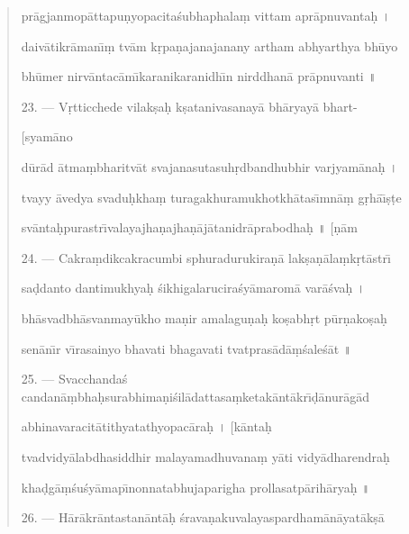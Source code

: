 \documentclass[a4paper, 11pt, oneside, french]{article}
\begin{document}
\begin{quotation}
pr\={a}gjanmop\={a}ttapu\d{n}yopacita\'{s}ubhaphala\d{m} vittam apr\={a}pnuvanta\d{h} \texthindi{।}

daiv\={a}tikr\={a}man\={\i}\d{m} tv\={a}m k\d{r}pa\d{n}ajanajanany artham abhyarthya bh\={u}yo

bh\={u}mer nirv\={a}ntac\={a}m\={\i}karanikaranidh\={\i}n nirddhan\={a} pr\={a}pnuvanti \texthindi{॥}

\bigskip

23. --- V\d{r}tticchede vilak\d{s}a\d{h} k\d{s}atanivasanay\={a} bh\={a}ryay\={a} bhart-

\hspace*{85mm}[syam\={a}no

d\={u}r\={a}d \={a}tma\d{m}bharitv\={a}t svajanasutasuh\d{r}dbandhubhir varjyam\={a}na\d{h} \texthindi{।}

tvayy \={a}vedya svadu\d{h}kha\d{m} turagakhuramukhotkh\={a}tas\={\i}mn\={a}\d{m} g\d{r}h\={a}\={\i}\d{s}\d{t}e

sv\={a}nta\d{h}purastr\={\i}valayajha\d{n}ajha\d{n}\={a}j\={a}tanidr\={a}prabodha\d{h} \texthindi{॥} [\d{n}\={a}m

\bigskip

24. --- Cakra\d{m}dikcakracumbi sphuradurukira\d{n}\={a} lak\d{s}a\d{n}\={a}la\d{m}k\d{r}t\={a}str\={\i}

sa\d{d}danto dantimukhya\d{h} \'{s}ikhigalarucira\'{s}y\={a}marom\={a} var\={a}\'{s}va\d{h} \texthindi{।}

bh\={a}svadbh\={a}svanmay\={u}kho ma\d{n}ir amalagu\d{n}a\d{h} ko\d{s}abh\d{r}t p\={u}r\d{n}ako\d{s}a\d{h}

sen\={a}n\={\i}r v\={\i}rasainyo bhavati bhagavati tvatpras\={a}d\={a}\d{m}\'{s}ale\'{s}\={a}t \texthindi{॥}

\bigskip

25. --- Svacchanda\'{s} candan\={a}\d{m}bha\d{h}surabhima\d{n}i\'{s}il\={a}dattasa\d{m}ketak\={a}nt\={a}kr\={\i}\d{d}\={a}nur\={a}g\={a}d

abhinavaracit\={a}tithyatathyopac\={a}ra\d{h} \texthindi{।} [k\={a}nta\d{h}

tvadvidy\={a}labdhasiddhir malayamadhuvana\d{m} y\={a}ti vidy\={a}dharendra\d{h}

kha\d{d}g\={a}\d{m}\'{s}u\'{s}y\={a}map\={\i}nonnatabhujaparigha prollasatp\={a}rih\={a}rya\d{h} \texthindi{॥}

\bigskip

26. --- H\={a}r\={a}kr\={a}ntastan\={a}nt\={a}\d{h} \'{s}rava\d{n}akuvalayaspardham\={a}n\={a}yat\={a}k\d{s}\={a}


\end{quotation}
\end{document}
